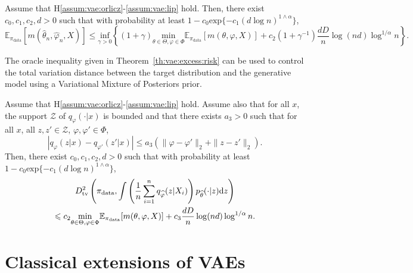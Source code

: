 \documentclass[english,graybox,envcountchap,envcountsame,sectrefs,shortlabels]{svmono}
\theoremstyle{style}
\newcommand{\eqsp}{}
\begin{document}
\begin{theorem}
\label{th:vae:excess:risk}
Assume that H\ref{assum:vae:orlicz}-\ref{assum:vae:lip} hold. Then, there exist $c_0,c_1,c_2,d>0$ such that with probability at least $1- c_0 \mathrm{exp}\{-c_1(d\log n)^{1\wedge \alpha}\}$,
$$
\mathbb{E}_{\pi_{\mathrm{data}}}\left[m(\widehat \theta_n,\widehat\varphi_n,X)\right]\leqslant \underset{\gamma>0}{\mathrm{inf}}\left\{(1+\gamma) \underset{\theta\in\Theta,\varphi\in\Phi}{\mathrm{min}}\mathbb{E}_{\pi_{\mathrm{data}}}[m(\theta,\varphi,X)] + c_2(1+\gamma^{-1})\frac{dD}{n}\log(nd)\log^{1/\alpha}n\right\}\eqsp.
$$
\end{theorem}
The oracle inequality given in Theorem~\ref{th:vae:excess:risk} can be used to control the total variation distance between the target distribution and the generative model  using a Variational Mixture of Posteriors prior.
\begin{proposition}
\label{prop:vaemixtprior}
Assume that H\ref{assum:vae:orlicz}-\ref{assum:vae:lip} hold. Assume also that for all $x$, the support $\mathcal{Z}$ of $q_\varphi(\cdot|x)$ is bounded and that there exists $a_3>0$ such that for all $x$, all $z,z'\in \mathcal{Z}$, $\varphi,\varphi'\in\Phi$,
$$
\left|q_\varphi(z|x) - q_{\varphi'}(z'|x)\right| \leqslant a_3 \left( \|\varphi-\varphi'\|_2 + \|z-z'\|_2\right)\eqsp.
$$
Then, there exist $c_0,c_1,c_2,d>0$ such that with probability at least $1- c_0 \mathrm{exp}\{-c_1(d\log n)^{1\wedge \alpha}\}$,
\begin{multline*}
D_{\mathrm{tv}}^2\left(\pi_{\mathrm{data}},\int \left(\frac{1}{n}\sum_{i=1}^n q_{\widehat \varphi}(z|X_i)\right)p_{\widehat \theta}(\cdot|z)\rmd z\right)\\
\leqslant c_2 \underset{\theta\in\Theta,\varphi\in\Phi}{\mathrm{min}}\mathbb{E}_{\pi_{\mathrm{data}}}[m(\theta,\varphi,X)] + c_3\frac{dD}{n}\log(nd)\log^{1/\alpha}n\eqsp.
\end{multline*}
\end{proposition}

\section{Classical extensions of VAEs}
\end{document}
